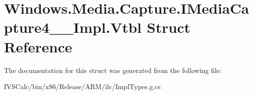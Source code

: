 \hypertarget{struct_windows_1_1_media_1_1_capture_1_1_i_media_capture4_____impl_1_1_vtbl}{}\section{Windows.\+Media.\+Capture.\+I\+Media\+Capture4\+\_\+\+\_\+\+Impl.\+Vtbl Struct Reference}
\label{struct_windows_1_1_media_1_1_capture_1_1_i_media_capture4_____impl_1_1_vtbl}


The documentation for this struct was generated from the following file\+:\begin{DoxyCompactItemize}
\item 
I\+V\+S\+Calc/bin/x86/\+Release/\+A\+R\+M/ilc/Impl\+Types.\+g.\+cs\end{DoxyCompactItemize}

